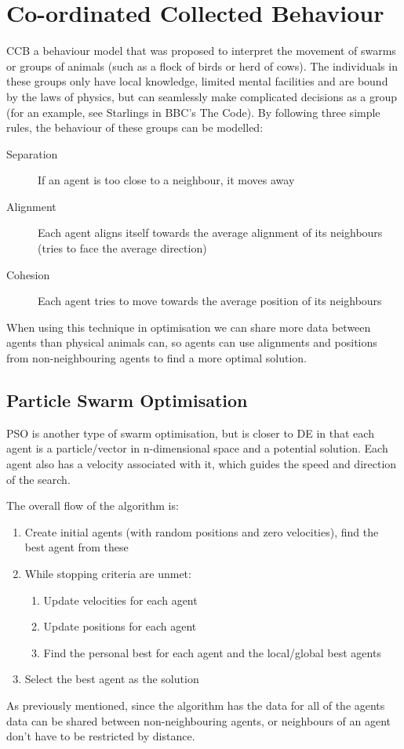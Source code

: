 \section{Co-ordinated Collected Behaviour}
CCB a behaviour model that was proposed to interpret the movement of swarms or groups of animals (such as a flock of birds or herd of cows). The individuals in these groups only have local knowledge, limited mental facilities and are bound by the laws of physics, but can seamlessly make complicated decisions as a group (for an example, see Starlings in BBC's The Code). By following three simple rules, the behaviour of these groups can be modelled:
\begin{description}
\item[Separation] If an agent is too close to a neighbour, it moves away
\item[Alignment] Each agent aligns itself towards the average alignment of its neighbours (tries to face the average direction)
\item[Cohesion] Each agent tries to move towards the average position of its neighbours
\end{description}
When using this technique in optimisation we can share more data between agents than physical animals can, so agents can use alignments and positions from non-neighbouring agents to find a more optimal solution.

\subsection{Particle Swarm Optimisation}
PSO is another type of swarm optimisation, but is closer to DE in that each agent is a particle/vector in n-dimensional space and a potential solution. Each agent also has a velocity associated with it, which guides the speed and direction of the search.

The overall flow of the algorithm is: 
\begin{enumerate}[label=\Alph*]
\item Create initial agents (with random positions and zero velocities), find the best agent from these
\item While stopping criteria are unmet:
\begin{enumerate}[label=\arabic*]
    \item Update velocities for each agent
    \item Update positions for each agent
    \item Find the personal best for each agent and the local/global best agents
\end{enumerate}
\item Select the best agent as the solution\\
\end{enumerate}
As previously mentioned, since the algorithm has the data for all of the agents data can be shared between non-neighbouring agents, or neighbours of an agent don't have to be restricted by distance. 

